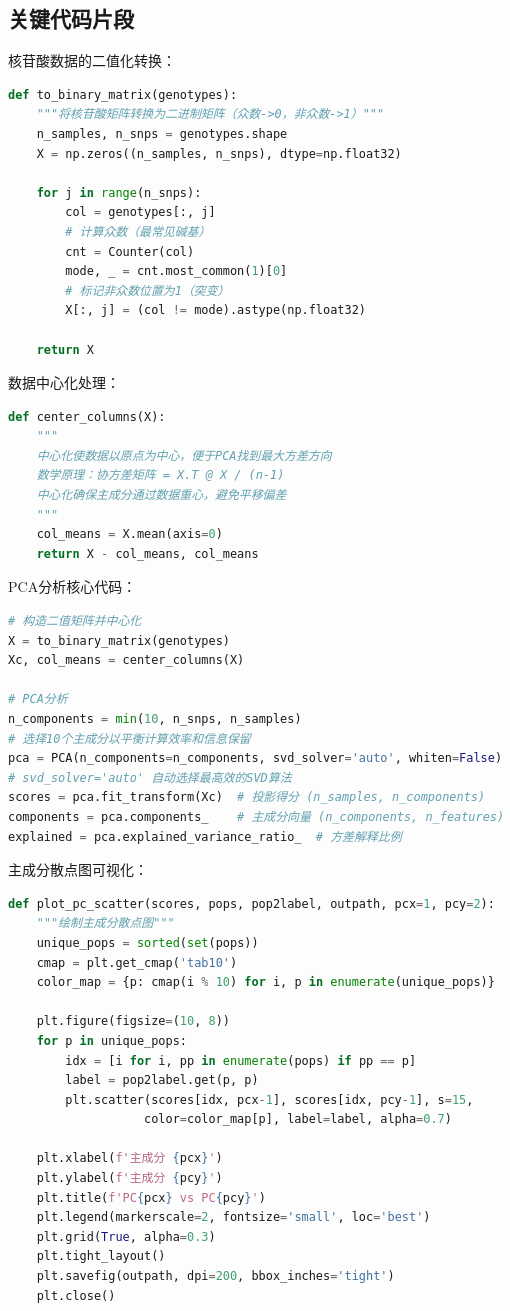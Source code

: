 \documentclass[a4paper]{article}
\begin{document}
\subsection{关键代码片段}

核苷酸数据的二值化转换：
\begin{lstlisting}[language=Python]
def to_binary_matrix(genotypes):
    """将核苷酸矩阵转换为二进制矩阵（众数->0，非众数->1）"""
    n_samples, n_snps = genotypes.shape
    X = np.zeros((n_samples, n_snps), dtype=np.float32)
    
    for j in range(n_snps):
        col = genotypes[:, j]
        # 计算众数（最常见碱基）
        cnt = Counter(col)
        mode, _ = cnt.most_common(1)[0]
        # 标记非众数位置为1（突变）
        X[:, j] = (col != mode).astype(np.float32)
    
    return X
\end{lstlisting}

数据中心化处理：
\begin{lstlisting}[language=Python]
def center_columns(X):
    """
    中心化使数据以原点为中心，便于PCA找到最大方差方向
    数学原理：协方差矩阵 = X.T @ X / (n-1)
    中心化确保主成分通过数据重心，避免平移偏差
    """
    col_means = X.mean(axis=0)
    return X - col_means, col_means
\end{lstlisting}

PCA分析核心代码：
\begin{lstlisting}[language=Python]
# 构造二值矩阵并中心化
X = to_binary_matrix(genotypes)
Xc, col_means = center_columns(X)

# PCA分析
n_components = min(10, n_snps, n_samples)
# 选择10个主成分以平衡计算效率和信息保留
pca = PCA(n_components=n_components, svd_solver='auto', whiten=False)
# svd_solver='auto' 自动选择最高效的SVD算法
scores = pca.fit_transform(Xc)  # 投影得分 (n_samples, n_components)
components = pca.components_    # 主成分向量 (n_components, n_features)
explained = pca.explained_variance_ratio_  # 方差解释比例
\end{lstlisting}

主成分散点图可视化：
\begin{lstlisting}[language=Python]
def plot_pc_scatter(scores, pops, pop2label, outpath, pcx=1, pcy=2):
    """绘制主成分散点图"""
    unique_pops = sorted(set(pops))
    cmap = plt.get_cmap('tab10')
    color_map = {p: cmap(i % 10) for i, p in enumerate(unique_pops)}
    
    plt.figure(figsize=(10, 8))
    for p in unique_pops:
        idx = [i for i, pp in enumerate(pops) if pp == p]
        label = pop2label.get(p, p)
        plt.scatter(scores[idx, pcx-1], scores[idx, pcy-1], s=15, 
                   color=color_map[p], label=label, alpha=0.7)
    
    plt.xlabel(f'主成分 {pcx}')
    plt.ylabel(f'主成分 {pcy}')
    plt.title(f'PC{pcx} vs PC{pcy}')
    plt.legend(markerscale=2, fontsize='small', loc='best')
    plt.grid(True, alpha=0.3)
    plt.tight_layout()
    plt.savefig(outpath, dpi=200, bbox_inches='tight')
    plt.close()
\end{lstlisting}
\end{document}
